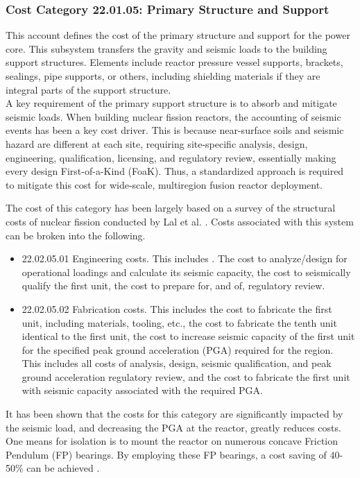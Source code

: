 \subsubsection*{Cost Category 22.01.05:  Primary Structure and Support}
\label{sec:22.1.5}
This account defines the cost of the primary structure and support for the power core. This subsystem  transfers the gravity and seismic loads to the building support structures. Elements include reactor pressure vessel supports, brackets, sealings, pipe supports, or others, including shielding materials if they are integral parts of the support structure. \\

A key requirement of the primary support structure is to absorb and mitigate seismic loads. When building nuclear fission reactors, the accounting of seismic events has been a key cost driver. This is because near-surface soils and seismic hazard are different at each site, requiring site-specific analysis, design, engineering, qualification, licensing, and regulatory review, essentially making every design First-of-a-Kind (FoaK). Thus, a standardized approach is required to mitigate this cost for wide-scale, multiregion fusion reactor deployment. 

The cost of this category has been largely based on a survey of the structural costs of nuclear fission conducted by Lal et al. \cite{lal2022towards}. Costs associated with this system can be broken into the following. 

\begin{itemize}
    \item 22.02.05.01 Engineering costs. This includes . The cost to analyze/design for operational loadings and calculate its seismic capacity, the cost to seismically qualify the first unit, the cost to prepare for, and of, regulatory review.
    \item 22.02.05.02 Fabrication costs. This includes the cost to fabricate the first unit, including materials, tooling, etc., the cost to fabricate the tenth unit identical to the first unit, the cost to increase seismic capacity of the first unit for the specified peak ground acceleration (PGA) required for the region. This includes all costs of analysis, design, seismic qualification, and peak ground acceleration regulatory review, and the cost to fabricate the first unit with seismic capacity associated with the required PGA. 
\end{itemize}

It has been shown \cite{lal2022towards} that the costs for this category are significantly impacted by the seismic load, and decreasing the PGA at the reactor, greatly reduces costs. One means for isolation is to mount the reactor on numerous concave Friction Pendulum (FP) bearings. By employing these FP bearings, a cost saving of 40-50\% can be achieved \cite{lal2022towards}.\\

